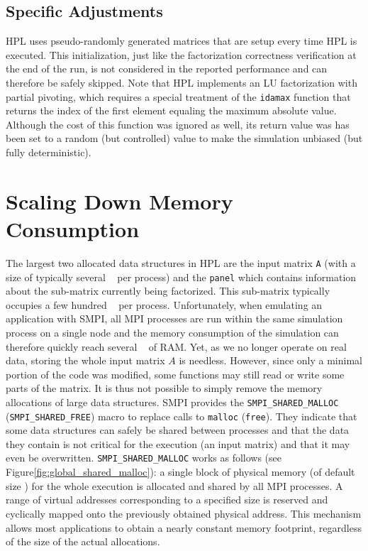         \subsection{Specific Adjustments}
            HPL uses pseudo-randomly generated matrices that are setup every time HPL is executed. This initialization, just
            like the factorization correctness verification at the end of the run, is not considered in the reported
            performance and can therefore be safely skipped.  Note that HPL implements an LU factorization with partial
            pivoting, which requires a special treatment of the \texttt{idamax} function that returns the index of the first
            element equaling the maximum absolute value. Although the cost of this function was ignored as well, its return
            value was has been set to a random (but controlled) value to make the simulation unbiased (but fully
            deterministic).

    \section{Scaling Down Memory Consumption}
        The largest two allocated data structures in HPL are the input matrix \texttt{A} (with a size of typically
        several \si{\giga\byte} per process) and the \texttt{panel} which contains information about the sub-matrix
        currently being factorized. This sub-matrix typically occupies a few hundred \si{\mega\byte} per process.
        Unfortunately, when emulating an application with SMPI, all MPI processes are run within the same simulation
        process on a single node and the memory consumption of the simulation can therefore quickly reach several
        \si{\tera\byte} of RAM.  Yet, as we no longer operate on real data, storing the whole input matrix \(A\) is
        needless. However, since only a minimal portion of the code was modified, some functions may still read or write
        some parts of the matrix.  It is thus not possible to simply remove the memory allocations of large data
        structures. SMPI provides the \texttt{SMPI\_SHARED\_MALLOC} (\texttt{SMPI\_SHARED\_FREE}) macro to replace calls
        to \texttt{malloc} (\texttt{free}). They indicate that some data structures can safely be shared between
        processes and that the data they contain is not critical for the execution (\eg an input matrix) and that it may
        even be overwritten. \texttt{SMPI\_SHARED\_MALLOC} works as follows (see
        Figure\ref{fig:global_shared_malloc}): a single block of physical memory (of default size )
        for the whole execution is allocated and shared by all MPI processes.  A range of virtual addresses
        corresponding to a specified size is reserved and cyclically mapped onto the previously obtained physical
        address.  This mechanism allows most applications to obtain a nearly constant memory footprint, regardless of
        the size of the actual allocations.

